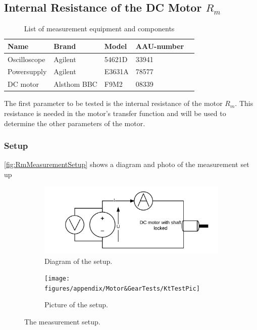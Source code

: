\subsection{Internal Resistance of the DC Motor $R_m$}\label{sec:MeasRm}
\begin{table}[htbp]
	\centering
	\caption{List of measurement equipment and components}\label{tab_appendix:RMSetUp}
	
	\begin{tabularx}{\textwidth}{lXXXX}
		Name 				& Brand	& Model & AAU-number									\\ \toprule \rowcolor{lightGrey}
		Oscilloscope	& Agilent & 54621D & 33941 	\\
		Powersupply	& Agilent & E3631A & 78577\\ \rowcolor{lightGrey}
		DC motor & Alsthom BBC & F9M2& 08339
	\end{tabularx}
\end{table}


The first parameter to be tested is the internal resistance of the motor $R_m$. This resistance is needed in the motor's transfer function and will be used to determine the other parameters of the motor. 
\subsubsection*{Setup}
\autoref{fig:RmMeasurementSetup} shows a diagram and photo of the measurement set up
\begin{figure}[htbp]
	\centering
	\begin{subfigure}{0.50\textwidth}
		\includegraphics[width=1\textwidth]{figures/appendix/Motor&GearTests/RmTestSetUpDiagram}
		\caption{Diagram of the setup.} \label{fig:RmMeasurementDiagram}
	\end{subfigure}
	\begin{subfigure}{0.40\textwidth}
			\texttt{[image: figures/appendix/Motor\&GearTests/KtTestPic]}
		\caption{Picture of the setup.} \label{fig:RmMeasurementPictures}
	\end{subfigure}
	\caption{The measurement setup.} \label{fig:RmMeasurementSetup}   
\end{figure} 

